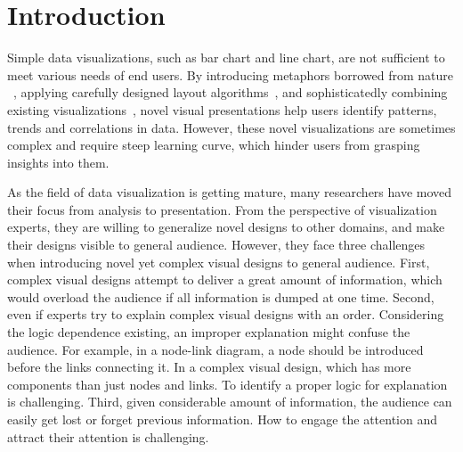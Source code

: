 
\section{Introduction} %
Simple data visualizations, such as bar chart and line chart, are not sufficient to meet various needs of end users.
By introducing metaphors borrowed from nature ~\cite{cao_whisper:_2012,huron_visual_2013}, applying carefully designed layout algorithms~\cite{wu_opinionflow:_2014,chi_morphable_2015}, and sophisticatedly combining existing visualizations~\cite{zhao_x0023;fluxflow:_2014}, novel visual presentations help users identify patterns, trends and correlations in data. However, these novel visualizations are sometimes complex and require steep learning curve, which hinder users from grasping insights into them.

As the field of data visualization is getting mature, many researchers have moved their focus from analysis to presentation.
From the perspective of visualization experts, they are willing to generalize novel designs to other domains, and make their designs visible to general audience. However, they face three challenges when introducing novel yet complex visual designs to general audience.
First, complex visual designs attempt to deliver a great amount of information, which would overload the audience if all information is dumped at one time. Second, even if experts try to explain complex visual designs with an order. Considering the logic dependence existing, an improper explanation might confuse the audience. For example, in a node-link diagram, a node should be introduced before the links connecting it. In a complex visual design, which has more components than just nodes and links. To identify a proper logic for explanation is challenging. Third, given considerable amount of information, the audience can easily get lost or forget previous information. How to engage the attention and attract their attention is challenging.  


